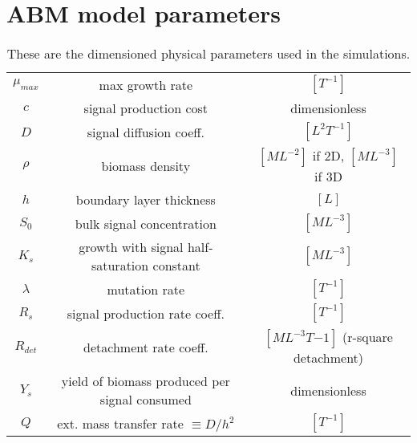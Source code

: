 \documentclass[11pt]{amsart}
\begin{document}
	\section{ABM model parameters}
		\begin{center}
			\renewcommand{\arraystretch}{2}
			\begin{table}[h]
				\caption{These are the dimensioned physical parameters used in the simulations.}
				\begin{tabular}{c | c | c }
					\(\mu_{max}\) & max growth rate & \([T^{-1}]\) \\
					\(c\) & signal production cost & dimensionless \\
					\(D\) & signal diffusion coeff. & \([L^2T^{-1}]\) \\
					\(\rho\) & biomass density & \([ML^{-2}]\) if 2D, \([ML^{-3}]\) if 3D \\
					\(h\) & boundary layer thickness & \([L]\) \\
					\(S_0\) & bulk signal concentration & \([ML^{-3}]\) \\
					\(K_s\) & growth with signal half-saturation constant & \([ML^{-3}]\) \\
					\(\lambda\) & mutation rate & \([T^{-1}]\) \\
					\(R_s\) & signal production rate coeff. & \([T^{-1}]\) \\
					\(R_{det}\) & detachment rate coeff. & \([ML^{-3}T{-1}]\) (r-square detachment)\\
					\(Y_s\) & yield of biomass produced per signal consumed & dimensionless \\
					\(Q\) & ext. mass transfer rate \( \equiv D/h^2 \) & \([T^{-1}]\) \\
				\end{tabular}
			\end{table}
		\end{center}
	
	\newpage
\end{document}
